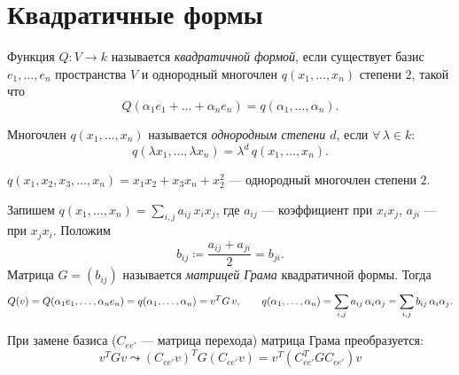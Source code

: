 \section{Квадратичные формы}

\begin{definition}
    Функция $Q\colon V \to k$ называется \emph{квадратичной формой},
    если существует базис $e_1, \dots, e_n$ пространства $V$ и однородный многочлен $q(x_1, \dots, x_n)$ степени
    $2$, такой что
    \[
        Q(\alpha_1 e_1 + \dots + \alpha_n e_n) = q(\alpha_1, \dots, \alpha_n).
    \]
\end{definition}


\begin{remark}
    Многочлен $q(x_1, \dots, x_n)$ называется \emph{однородным степени $d$}, если $\forall\, \lambda \in k$:
    \[
        q(\lambda x_1, \dots, \lambda x_n) = \lambda^d\, q(x_1, \dots, x_n).
    \]
\end{remark}


\begin{example}
    $q(x_1, x_2, x_3, \dots, x_n) = x_1 x_2 + x_3 x_n + x_2^2$ --- однородный многочлен степени $2$.
\end{example}


\begin{definition}
    Запишем $q(x_1, \dots, x_n) = \sum_{i, j} a_{ij}\, x_i x_j$,
    где $a_{ij}$ --- коэффициент при $x_i x_j$, $a_{ji}$ --- при $x_j x_i$. Положим
    \[
        b_{ij} \coloneqq \frac{a_{ij} + a_{ji}}{2} = b_{ji}.
    \]
    Матрица $G = (b_{ij})$ называется \emph{матрицей Грама} квадратичной формы. Тогда
    \[
        Q(v) = Q(\alpha_1 e_1, \dots, \alpha_n e_n) = q(\alpha_1, \dots, \alpha_n) = v^T G\, v, \\
        \qquad q(\alpha_1, \dots, \alpha_n) = \sum_{i,j} a_{ij}\, \alpha_i \alpha_j = \sum_{i,j} b_{ij}
        \, \alpha_i \alpha_j.
    \]
\end{definition}


\begin{stmt}
    При замене базиса ($C_{ee'}$ --- матрица перехода) матрица Грама преобразуется:
    \[
        v^T G v \leadsto (C_{ee'} v)^T G (C_{ee'} v) = v^T \left( C_{ee'}^T G C_{ee'} \right) v
    \]
\end{stmt}


